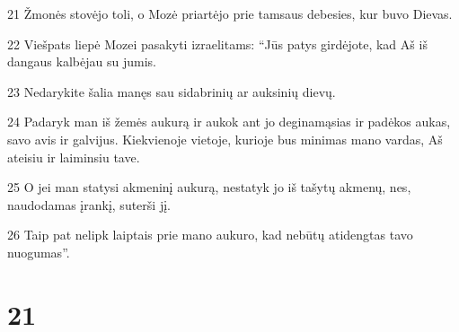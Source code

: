 \par 21 Žmonės stovėjo toli, o Mozė priartėjo prie tamsaus debesies, kur buvo Dievas. 
\par 22 Viešpats liepė Mozei pasakyti izraelitams: “Jūs patys girdėjote, kad Aš iš dangaus kalbėjau su jumis. 
\par 23 Nedarykite šalia manęs sau sidabrinių ar auksinių dievų. 
\par 24 Padaryk man iš žemės aukurą ir aukok ant jo deginamąsias ir padėkos aukas, savo avis ir galvijus. Kiekvienoje vietoje, kurioje bus minimas mano vardas, Aš ateisiu ir laiminsiu tave. 
\par 25 O jei man statysi akmeninį aukurą, nestatyk jo iš tašytų akmenų, nes, naudodamas įrankį, suterši jį. 
\par 26 Taip pat nelipk laiptais prie mano aukuro, kad nebūtų atidengtas tavo nuogumas”.



\chapter{21}


